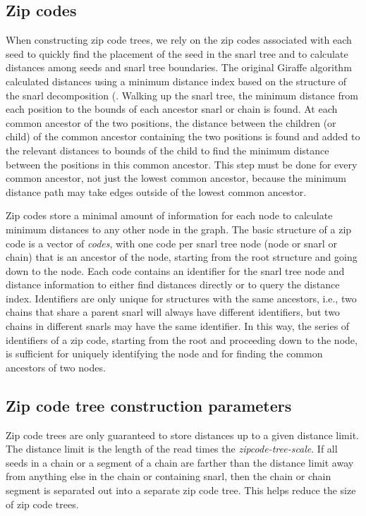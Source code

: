 \documentclass[11pt]{ucscthesis}
\begin{document}
\subsection{Zip codes}
When constructing zip code trees, we rely on the zip codes associated with each seed to quickly find the placement of the seed in the snarl tree and to calculate distances among seeds and snarl tree boundaries.
The original Giraffe algorithm calculated distances using a minimum distance index based on the structure of the snarl decomposition (\cite{paten_superbubbles_2018}.
Walking up the snarl tree, the minimum distance from each position to the bounds of each ancestor snarl or chain is found.
At each common ancestor of the two positions, the distance between the children (or child) of the common ancestor containing the two positions is found and added to the relevant distances to bounds of the child to find the minimum distance between the positions in this common ancestor.
This step must be done for every common ancestor, not just the lowest common ancestor, because the minimum distance path may take edges outside of the lowest common ancestor.

Zip codes store a minimal amount of information for each node to calculate minimum distances to any other node in the graph.
The basic structure of a zip code is a vector of \emph{codes}, with one code per snarl tree node (node or snarl or chain) that is an ancestor of the node, starting from the root structure and going down to the node.
Each code contains an identifier for the snarl tree node and distance information to either find distances directly or to query the distance index.
Identifiers are only unique for structures with the same ancestors, i.e., two chains that share a parent snarl will always have different identifiers, but two chains in different snarls may have the same identifier.
In this way, the series of identifiers of a zip code, starting from the root and proceeding down to the node, is sufficient for uniquely identifying the node and for finding the common ancestors of two nodes.

 
\subsection{Zip code tree construction parameters}
Zip code trees are only guaranteed to store distances up to a given distance limit.
The distance limit is the length of the read times the \emph{zipcode-tree-scale}.
If all seeds in a chain or a segment of a chain are farther than the distance limit away from anything else in the chain or containing snarl, then the chain or chain segment is separated out into a separate zip code tree.
This helps reduce the size of zip code trees.
\end{document}
